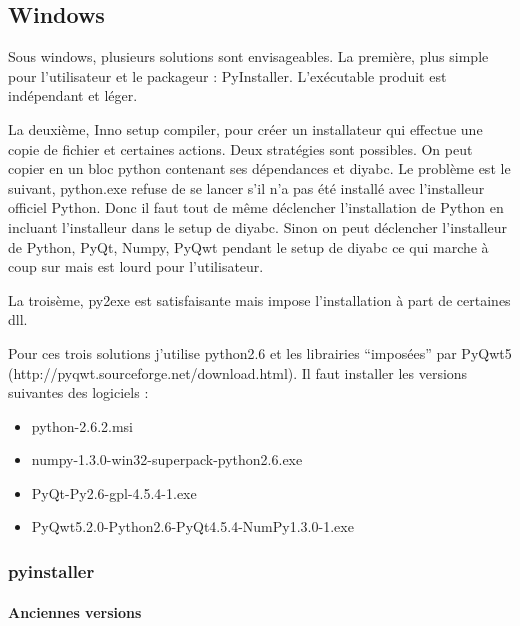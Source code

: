 \documentclass[12pt,a4paper]{article}
\begin{document}
    
    \subsection{Windows}
        Sous windows, plusieurs solutions sont envisageables. La première, plus
        simple pour l'utilisateur et le packageur : PyInstaller. L'ex\'ecutable
        produit est ind\'ependant et l\'eger. \newline

        La deuxième, Inno setup compiler, pour cr\'eer un installateur qui
        effectue une copie de fichier et certaines actions.  Deux strat\'egies
        sont possibles. On peut copier en un bloc python contenant ses
        d\'ependances et diyabc. Le problème est le suivant, python.exe refuse
        de se lancer s'il n'a pas \'et\'e install\'e avec l'installeur officiel
        Python. Donc il faut tout de même d\'eclencher l'installation de Python
        en incluant l'installeur dans le setup de diyabc. Sinon on peut
        d\'eclencher l'installeur de Python, PyQt, Numpy, PyQwt pendant le setup
        de diyabc ce qui marche à coup sur mais est lourd pour
        l'utilisateur.\newline
        
        La troisème, py2exe est satisfaisante mais impose l'installation à part
        de certaines dll.\newline

        Pour ces trois solutions j'utilise python2.6 et les librairies
        ``impos\'ees'' par PyQwt5 (http://pyqwt.sourceforge.net/download.html).
        Il faut installer les versions suivantes des logiciels :
        \begin{itemize}
            \item python-2.6.2.msi
            \item numpy-1.3.0-win32-superpack-python2.6.exe
            \item PyQt-Py2.6-gpl-4.5.4-1.exe
            \item PyQwt5.2.0-Python2.6-PyQt4.5.4-NumPy1.3.0-1.exe
        \end{itemize}

        \subsubsection{pyinstaller}

        \paragraph{Anciennes versions}
\end{document}
